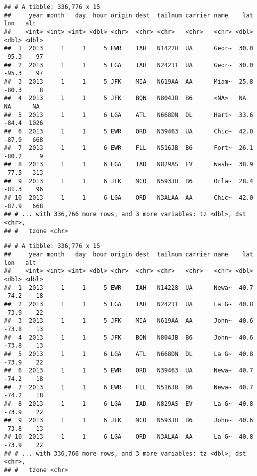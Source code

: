 \documentclass[
]{article}
\newenvironment{Shaded}{\begin{snugshade}}{\end{snugshade}}
\newcommand{\KeywordTok}[1]{\textcolor[rgb]{0.13,0.29,0.53}{\textbf{#1}}}
\newcommand{\NormalTok}[1]{#1}
\newcommand{\OperatorTok}[1]{\textcolor[rgb]{0.81,0.36,0.00}{\textbf{#1}}}
\newcommand{\StringTok}[1]{\textcolor[rgb]{0.31,0.60,0.02}{#1}}
\begin{document}
\begin{verbatim}
## # A tibble: 336,776 x 15
##     year month   day  hour origin dest  tailnum carrier name    lat   lon   alt
##    <int> <int> <int> <dbl> <chr>  <chr> <chr>   <chr>   <chr> <dbl> <dbl> <dbl>
##  1  2013     1     1     5 EWR    IAH   N14228  UA      Geor~  30.0 -95.3    97
##  2  2013     1     1     5 LGA    IAH   N24211  UA      Geor~  30.0 -95.3    97
##  3  2013     1     1     5 JFK    MIA   N619AA  AA      Miam~  25.8 -80.3     8
##  4  2013     1     1     5 JFK    BQN   N804JB  B6      <NA>   NA    NA      NA
##  5  2013     1     1     6 LGA    ATL   N668DN  DL      Hart~  33.6 -84.4  1026
##  6  2013     1     1     5 EWR    ORD   N39463  UA      Chic~  42.0 -87.9   668
##  7  2013     1     1     6 EWR    FLL   N516JB  B6      Fort~  26.1 -80.2     9
##  8  2013     1     1     6 LGA    IAD   N829AS  EV      Wash~  38.9 -77.5   313
##  9  2013     1     1     6 JFK    MCO   N593JB  B6      Orla~  28.4 -81.3    96
## 10  2013     1     1     6 LGA    ORD   N3ALAA  AA      Chic~  42.0 -87.9   668
## # ... with 336,766 more rows, and 3 more variables: tz <dbl>, dst <chr>,
## #   tzone <chr>
\end{verbatim}

\begin{Shaded}
\end{Shaded}

\begin{verbatim}
## # A tibble: 336,776 x 15
##     year month   day  hour origin dest  tailnum carrier name    lat   lon   alt
##    <int> <int> <int> <dbl> <chr>  <chr> <chr>   <chr>   <chr> <dbl> <dbl> <dbl>
##  1  2013     1     1     5 EWR    IAH   N14228  UA      Newa~  40.7 -74.2    18
##  2  2013     1     1     5 LGA    IAH   N24211  UA      La G~  40.8 -73.9    22
##  3  2013     1     1     5 JFK    MIA   N619AA  AA      John~  40.6 -73.8    13
##  4  2013     1     1     5 JFK    BQN   N804JB  B6      John~  40.6 -73.8    13
##  5  2013     1     1     6 LGA    ATL   N668DN  DL      La G~  40.8 -73.9    22
##  6  2013     1     1     5 EWR    ORD   N39463  UA      Newa~  40.7 -74.2    18
##  7  2013     1     1     6 EWR    FLL   N516JB  B6      Newa~  40.7 -74.2    18
##  8  2013     1     1     6 LGA    IAD   N829AS  EV      La G~  40.8 -73.9    22
##  9  2013     1     1     6 JFK    MCO   N593JB  B6      John~  40.6 -73.8    13
## 10  2013     1     1     6 LGA    ORD   N3ALAA  AA      La G~  40.8 -73.9    22
## # ... with 336,766 more rows, and 3 more variables: tz <dbl>, dst <chr>,
## #   tzone <chr>
\end{verbatim}
\end{document}
